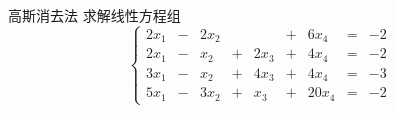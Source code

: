 \begin{frame}
  \begin{overprint}
  \begin{exampleblock}{高斯消去法}
    求解线性方程组
    $$
    \left\{
    \begin{array}{rcrcrcrcrr}
      2x_1 & - & 2x_2 &   &      & + &  6x_4 & = &-2 \\[0.1cm]
      2x_1 & - &  x_2 & + & 2x_3 & + &  4x_4 & = &-2 \\[0.1cm]
      3x_1 & - &  x_2 & + & 4x_3 & + &  4x_4 & = &-3 \\[0.1cm]
      5x_1 & - & 3x_2 & + &  x_3 & + & 20x_4 & = &-2 
    \end{array}
    \right.
    $$
  \end{exampleblock}    
  \end{overprint}

  \begin{overprint}
\end{overprint}
\end{frame}
